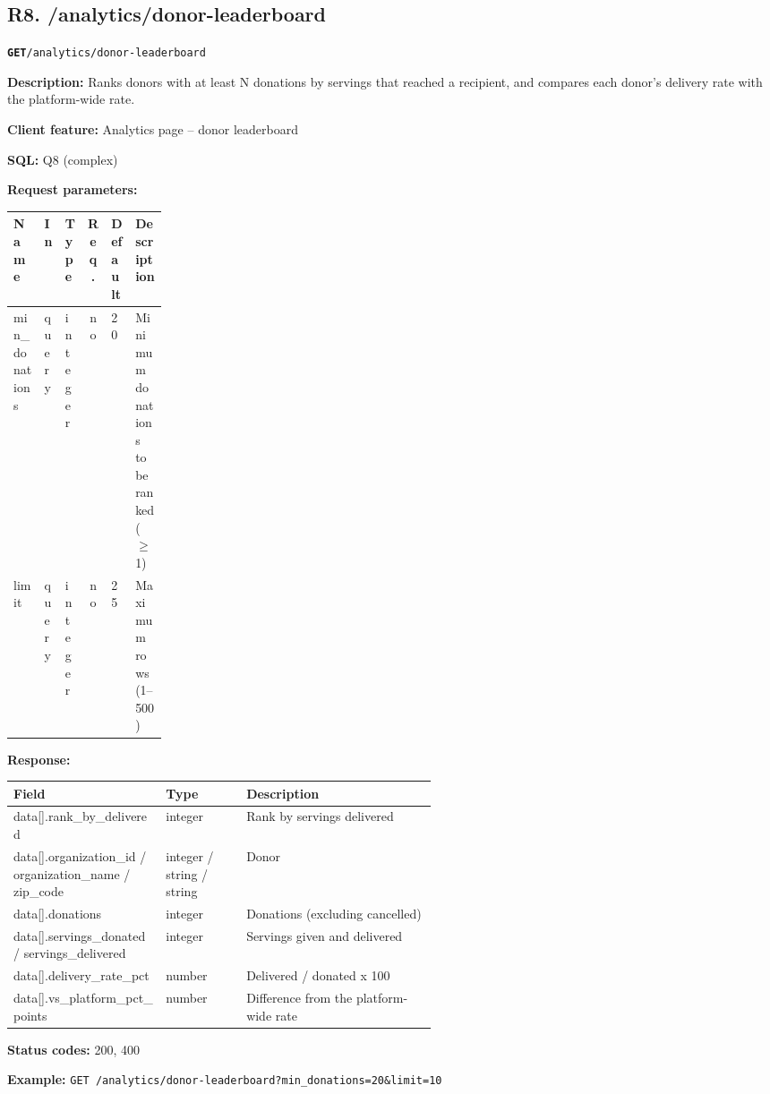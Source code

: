 \documentclass[11pt,letterpaper]{article}
\newcommand{\brk}{\penalty0\relax}
\newcommand{\routebar}[2]{%
  \par\noindent\colorbox{boxGray}{\parbox{\dimexpr\linewidth-2\fboxsep}{%
  \strut\textbf{\texttt{#1}}\quad\texttt{#2}\strut}}\par\smallskip}
\newcommand{\kv}[2]{\textbf{#1:} #2\par}
\begin{document}
\subsection*{R8. /analytics/donor-leaderboard}
\routebar{GET}{/analytics/donor-leaderboard}
\kv{Description}{Ranks donors with at least N donations by servings that reached a recipient, and compares each donor's delivery rate with the platform-wide rate.}
\kv{Client feature}{Analytics page -- donor leaderboard}
\kv{SQL}{Q8 (complex)}
\kv{Request parameters}{}
\begin{xltabular}{\linewidth}{>{\ttfamily\raggedright\arraybackslash}p{0.2\linewidth} l l c l >{\raggedright\arraybackslash}X}
\toprule
\textrm{\textbf{Name}} & \textbf{In} & \textbf{Type} & \textbf{Req.} & \textbf{Default} & \textbf{Description} \\
\midrule
min\_\brk{}donations & query & integer & no & 20 & Minimum donations to be ranked ($\ge$ 1) \\
limit & query & integer & no & 25 & Maximum rows (1--500) \\
\bottomrule
\end{xltabular}
\kv{Response}{}
\begin{xltabular}{\linewidth}{>{\ttfamily\raggedright\arraybackslash}p{0.36\linewidth} >{\raggedright\arraybackslash}p{0.19\linewidth} >{\raggedright\arraybackslash}X}
\toprule
\textrm{\textbf{Field}} & \textbf{Type} & \textbf{Description} \\
\midrule
data[].\brk{}rank\_by\_delivered & integer & Rank by servings delivered \\
data[].\brk{}organization\_id /\brk{} organization\_name /\brk{} zip\_code & integer / string / string & Donor \\
data[].\brk{}donations & integer & Donations (excluding cancelled) \\
data[].\brk{}servings\_donated /\brk{} servings\_delivered & integer & Servings given and delivered \\
data[].\brk{}delivery\_rate\_pct & number & Delivered / donated x 100 \\
data[].\brk{}vs\_platform\_pct\_points & number & Difference from the platform-wide rate \\
\bottomrule
\end{xltabular}
\kv{Status codes}{200, 400}
{\raggedright\textbf{Example:} {\small \texttt{GET /\brk{}analytics/\brk{}donor-leaderboard?\brk{}min\_donations=\brk{}20\&\brk{}limit=\brk{}10}}\par}
\end{document}

